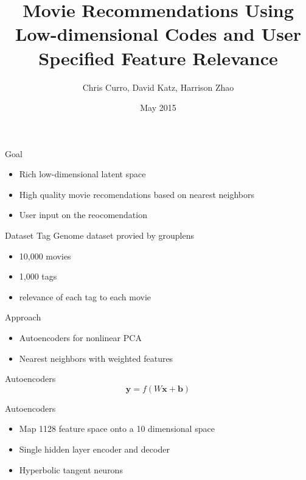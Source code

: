 \documentclass{beamer}
\title{Movie Recommendations Using Low-dimensional Codes and User Specified Feature Relevance}
\author{Chris Curro, David Katz, Harrison Zhao}
\date{May 2015}
\begin{document}
\begin{frame}
\titlepage
\end{frame}

\begin{frame}{Goal}
\begin{itemize}
\item Rich low-dimensional latent space
\item High quality movie recomendations based on nearest neighbors
\item User input on the reocomendation
\end{itemize}
\end{frame}

\begin{frame}{Dataset}
Tag Genome dataset provied by grouplens
\begin{itemize}
\item 10,000 movies
\item 1,000 tags
\item relevance of each tag to each movie
\end{itemize}
\end{frame}

\begin{frame}{Approach}
\begin{itemize}
\item Autoencoders for nonlinear PCA
\item Nearest neighbors with weighted features
\end{itemize}
\end{frame}

\begin{frame}{Autoencoders}
\begin{equation}
\mathbf{y} = f\left(W\mathbf{x} + \mathbf{b}\right)
\end{equation}
\begin{center}

\end{center}
\end{frame}

\begin{frame}{Autoencoders}
\begin{itemize}
\item Map 1128 feature space onto a 10 dimensional space
\item Single hidden layer encoder and decoder
\item Hyperbolic tangent neurons
\end{itemize}
\end{frame}
\end{document}

